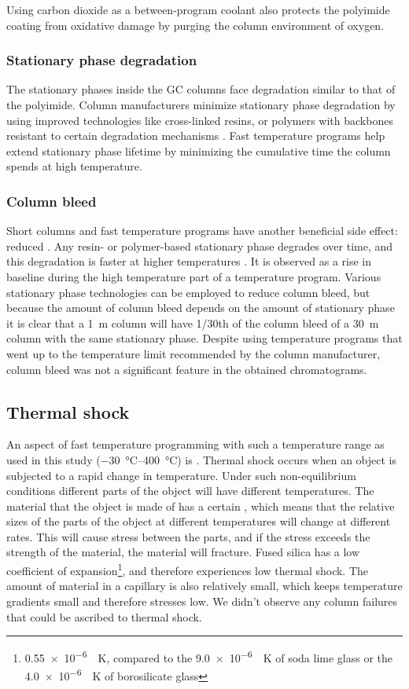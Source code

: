 Using carbon dioxide as a between-program coolant also protects the polyimide
coating from oxidative damage by purging the column environment of oxygen.

\subsubsection{Stationary phase degradation}

The stationary phases inside the GC columns face degradation similar to that of
the polyimide. Column manufacturers minimize sta\-tion\-ary phase degradation by
using improved technologies like cross-linked resins, or polymers with backbones
resistant to certain degradation mechanisms \autocite{Day2003}.
Fast temperature programs help extend stationary phase lifetime by minimizing
the cumulative time the column spends at high temperature.

\subsubsection{Column bleed}
Short columns and fast temperature programs have another beneficial side effect:
reduced . Any resin- or polymer-based stationary phase
degrades over time, and this degradation is faster at higher temperatures
\autocite[p. 66]{Mcnair2019}. It is observed as a rise in baseline during the
high temperature part of a temperature program. Various stationary phase
technologies can be employed to reduce column bleed, but because the amount of
column bleed depends on the amount of stationary phase it is clear that a
\SI{1}{\metre} column will have \num{1/30}th of the column bleed of a
\SI{30}{\metre} column with the same stationary phase. Despite using temperature
programs that went up to the temperature limit recommended by the column
manufacturer, column bleed was not a significant feature in the obtained
chromatograms.

\subsection{Thermal shock}
An aspect of fast temperature programming with such a temperature range as used
in this study (\SIrange{-30}{400}{\celsius}) is . Thermal
shock occurs when an object is subjected to a rapid change in temperature. Under
such non-equilibrium conditions different parts of the object will have
different temperatures. The material that the object is made of has a certain
, which means that the relative sizes
of the parts of the object at different temperatures will change at different
rates. This will cause stress between the parts, and if the stress exceeds the
strength of the material, the material will fracture. Fused silica has a low
coefficient of expansion\footnote{\SI{0.55e-6}{\per\kelvin}, compared to the
\SI{9.0e-6}{\per\kelvin} of soda lime glass or the \SI{4.0e-6}{\per\kelvin} of
borosilicate glass}, and therefore experiences low thermal shock. The amount of
material in a capillary is also relatively small, which keeps temperature
gradients small and therefore stresses low. We didn't observe any column
failures that could be ascribed to thermal shock.

